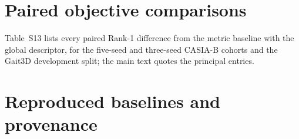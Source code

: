 \documentclass[11pt]{article}
\newcommand{\tablesetup}{\small\setlength{\tabcolsep}{4pt}}
\begin{document}
\begin{table}[!htbp]
\centering
\caption{Gait3D test, available-pose subset (947 probes, 5,122 gallery
sequences), evaluated once. Our rows give means over five seeds ($\pm$ seed
standard deviation for Rank-1 and mAP). ``Metric'' is the metric baseline and
``raw'' the raw-part descriptor. Parameters include the 2,892-way identity
classifier where present.}
\label{tab:s-gait3d-test}
{\tablesetup\footnotesize
}
\end{table}

\begin{table}[!htbp]
\centering
\caption{Raw part matching applied to GPGait, with paired differences. ``Full''
is the published descriptor and W its three whole-body embeddings; raw parts are
fused at $\lambda=0.5$ on GPGait's native distance. Intervals resample test
identities.}
\label{tab:s-gpgait-paired}
{\tablesetup\footnotesize
}
\end{table}

\section{Paired objective comparisons}
\label{sec:s-paired}

Table~S13 lists every paired Rank-1 difference from the metric baseline with
the global descriptor, for the five-seed and three-seed CASIA-B cohorts and the
Gait3D development split; the main text quotes the principal entries.

\begin{table}[!htbp]
\centering
\caption{Paired Rank-1 difference from the metric baseline (percentage points;
crossed 95\% bootstrap interval over seeds and identities), global descriptor.
The three-seed column is the earlier factorial on CASIA-B; Gait3D uses its
300-identity development split. Dashes mark objectives absent from a cohort. CE
denotes cross-entropy.}
\label{tab:s-paired}
{\tablesetup\footnotesize
}
\end{table}

\section{Reproduced baselines and provenance}
\label{sec:s-provenance}
\end{document}
